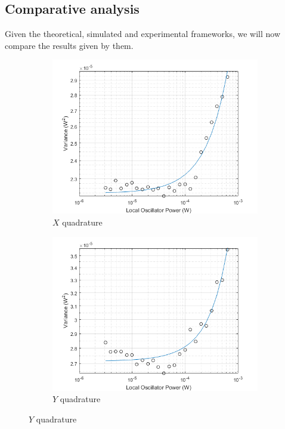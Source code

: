 \begin{bibunit}[plain]
\subsection{Comparative analysis}
%
%
Given the theoretical, simulated and experimental frameworks, we will now compare the results given by them.
\\
%
\begin{figure}[H]
	\begin{subfigure}{.5\textwidth}
		\centering
		\includegraphics[width=.8\linewidth]{./sdf/optical_detection/figures/noise_exp_channel1.png}
		\caption{$X$ quadrature}
		\label{fig:noise-exp-1}
	\end{subfigure}%
	\begin{subfigure}{.5\textwidth}
		\centering
		\includegraphics[width=.8\linewidth]{./sdf/optical_detection/figures/noise_exp_channel3.png}
		\caption{$Y$ quadrature}
		\label{fig:noise-exp-3}
	\end{subfigure}
	\captionsetup{justification=centering}

\end{figure}
\end{bibunit}
